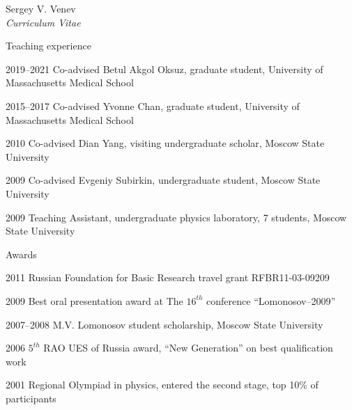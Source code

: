 \documentclass[10pt]{article}
\begin{document}
\begin{cv}{Sergey V. Venev\\{\large \itshape Curriculum Vitae}}
\setlength{\oldcvlabelwidth}{\cvlabelwidth}
\setlength{\cvlabelwidth}{1em}
\begin{cvlist}{Teaching experience}
        \item[2019--2021] Co-advised Betul Akgol Oksuz, graduate student, University of Massachusetts Medical School
        \item[2015--2017] Co-advised Yvonne Chan, graduate student, University of Massachusetts Medical School
        \item[2010] Co-advised Dian Yang, visiting undergraduate scholar, Moscow State University
        \item[2009] Co-advised Evgeniy Subirkin, undergraduate student, Moscow State University
        \item[2009] Teaching Assistant, undergraduate physics laboratory, 7 students, Moscow State University
\end{cvlist}
\setlength{\cvlabelwidth}{\oldcvlabelwidth}



\begin{cvlist}{Awards}
    \item[2011] Russian Foundation for Basic Research travel grant RFBR11-03-09209  
    \item[2009] Best oral presentation award at The $16^{th}$ conference ``Lomonosov--2009''  
    \item[2007--2008] M.V. Lomonosov student scholarship, Moscow State University  
    \item[2006] $5^{th}$ RAO UES of Russia award, ``New Generation'' on best qualification work 
    \item[2001] Regional Olympiad in physics, entered the second stage, top 10\% of participants
\end{cvlist}

\setlength{\oldcvlabelwidth}{\cvlabelwidth}
\setlength{\cvlabelwidth}{1em}
\renewcommand*{\biblabelsep}{1.5em}
% 


\end{cv}
\end{document}
